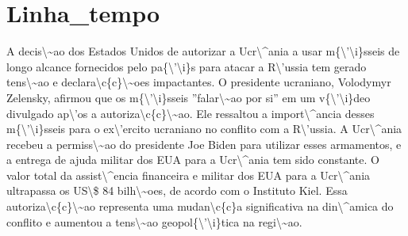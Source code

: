 \documentclass{article}%
\begin{document}
\section{Linha\_tempo}%
\label{sec:Linhatempo}%
A decis\textbackslash{}\textasciitilde{}ao dos Estados Unidos de autorizar a Ucr\textbackslash{}\^{}ania a usar m\{\textbackslash{}'\textbackslash{}i\}sseis de longo alcance fornecidos pelo pa\{\textbackslash{}'\textbackslash{}i\}s para atacar a R\textbackslash{}'ussia tem gerado tens\textbackslash{}\textasciitilde{}ao e declara\textbackslash{}c\{c\}\textbackslash{}\textasciitilde{}oes impactantes. O presidente ucraniano, Volodymyr Zelensky, afirmou que os m\{\textbackslash{}'\textbackslash{}i\}sseis ''falar\textbackslash{}\textasciitilde{}ao por si'' em um v\{\textbackslash{}'\textbackslash{}i\}deo divulgado ap\textbackslash{}'os a autoriza\textbackslash{}c\{c\}\textbackslash{}\textasciitilde{}ao. Ele ressaltou a import\textbackslash{}\^{}ancia desses m\{\textbackslash{}'\textbackslash{}i\}sseis para o ex\textbackslash{}'ercito ucraniano no conflito com a R\textbackslash{}'ussia. A Ucr\textbackslash{}\^{}ania recebeu a permiss\textbackslash{}\textasciitilde{}ao do presidente Joe Biden para utilizar esses armamentos, e a entrega de ajuda militar dos EUA para a Ucr\textbackslash{}\^{}ania tem sido constante. O valor total da assist\textbackslash{}\^{}encia financeira e militar dos EUA para a Ucr\textbackslash{}\^{}ania ultrapassa os US\textbackslash{}\$ 84 bilh\textbackslash{}\textasciitilde{}oes, de acordo com o Instituto Kiel. Essa autoriza\textbackslash{}c\{c\}\textbackslash{}\textasciitilde{}ao representa uma mudan\textbackslash{}c\{c\}a significativa na din\textbackslash{}\^{}amica do conflito e aumentou a tens\textbackslash{}\textasciitilde{}ao geopol\{\textbackslash{}'\textbackslash{}i\}tica na regi\textbackslash{}\textasciitilde{}ao.

%
\end{document}
